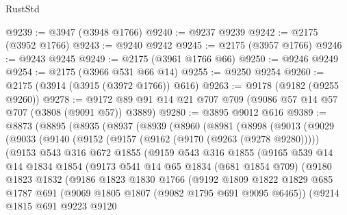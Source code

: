\begin{lexlean}{RustStd}
\begin{coremodule}
@9239 := @3947 (@3948 @1766)
@9240 := @9237 @9239
@9242 := @2175 (@3952 @1766)
@9243 := @9240 @9242
@9245 := @2175 (@3957 @1766)
@9246 := @9243 @9245
@9249 := @2175 (@3961 @1766 @66)
@9250 := @9246 @9249
@9254 := @2175 (@3966 @531 @66 @14)
@9255 := @9250 @9254
@9260 := @2175 (@3914 (@3915 (@3972 @1766)) @616)
@9263 := @9178 (@9182 (@9255 @9260))
@9278 := @9172 @89 @91 @14 @21 @707 @709 (@9086 @57 @14 @57 @707 (@3808 (@9091 @57)) @3889)
@9280 := @3895 @9012 @616
@9389 := @8873
    (@8895
      (@8935
        (@8937
          (@8939
            (@8960
              (@8981
                (@8998
                  (@9013
                    (@9029
                      (@9033
                        (@9140
                          (@9152
                            (@9157 (@9162 (@9170 (@9263 (@9278 @9280)))))
                            (@9153
                              @543
                              @316
                              @672
                              @1855
                              (@9159
                                @543
                                @316
                                @1855
                                (@9165
                                  @539
                                  @14
                                  @14
                                  @1834
                                  @1854
                                  (@9173
                                    @541
                                    @14
                                    @65
                                    @1834
                                    (@681 @1854 @709)
                                    (@9180
                                      @1823
                                      @1832
                                      (@9186
                                        @1823
                                        @1830
                                        @1766
                                        (@9192
                                          @1809
                                          @1822
                                          @1829
                                          @685
                                          @1787
                                          @691
                                          (@9069 @1805 @1807 (@9082 @1795 @691 @9095 @6465))
                                          (@9214
                                            @1815
                                            @691
                                            @9223
                                            @9120

\end{coremodule}
\end{lexlean}
